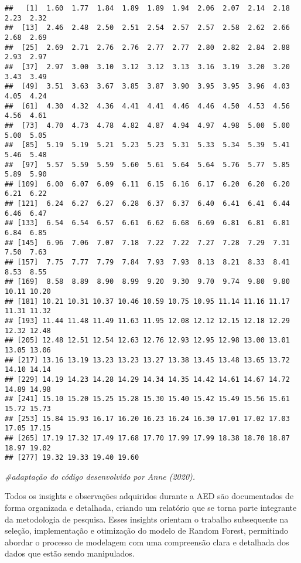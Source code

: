 \documentclass[
]{article}
\newenvironment{Shaded}{\begin{snugshade}}{\end{snugshade}}
\newcommand{\CommentTok}[1]{\textcolor[rgb]{0.56,0.35,0.01}{\textit{#1}}}
\begin{document}
\begin{verbatim}
##   [1]  1.60  1.77  1.84  1.89  1.89  1.94  2.06  2.07  2.14  2.18  2.23  2.32
##  [13]  2.46  2.48  2.50  2.51  2.54  2.57  2.57  2.58  2.62  2.66  2.68  2.69
##  [25]  2.69  2.71  2.76  2.76  2.77  2.77  2.80  2.82  2.84  2.88  2.93  2.97
##  [37]  2.97  3.00  3.10  3.12  3.12  3.13  3.16  3.19  3.20  3.20  3.43  3.49
##  [49]  3.51  3.63  3.67  3.85  3.87  3.90  3.95  3.95  3.96  4.03  4.05  4.24
##  [61]  4.30  4.32  4.36  4.41  4.41  4.46  4.46  4.50  4.53  4.56  4.56  4.61
##  [73]  4.70  4.73  4.78  4.82  4.87  4.94  4.97  4.98  5.00  5.00  5.00  5.05
##  [85]  5.19  5.19  5.21  5.23  5.23  5.31  5.33  5.34  5.39  5.41  5.46  5.48
##  [97]  5.57  5.59  5.59  5.60  5.61  5.64  5.64  5.76  5.77  5.85  5.89  5.90
## [109]  6.00  6.07  6.09  6.11  6.15  6.16  6.17  6.20  6.20  6.20  6.21  6.22
## [121]  6.24  6.27  6.27  6.28  6.37  6.37  6.40  6.41  6.41  6.44  6.46  6.47
## [133]  6.54  6.54  6.57  6.61  6.62  6.68  6.69  6.81  6.81  6.81  6.84  6.85
## [145]  6.96  7.06  7.07  7.18  7.22  7.22  7.27  7.28  7.29  7.31  7.50  7.63
## [157]  7.75  7.77  7.79  7.84  7.93  7.93  8.13  8.21  8.33  8.41  8.53  8.55
## [169]  8.58  8.89  8.90  8.99  9.20  9.30  9.70  9.74  9.80  9.80 10.11 10.20
## [181] 10.21 10.31 10.37 10.46 10.59 10.75 10.95 11.14 11.16 11.17 11.31 11.32
## [193] 11.44 11.48 11.49 11.63 11.95 12.08 12.12 12.15 12.18 12.29 12.32 12.48
## [205] 12.48 12.51 12.54 12.63 12.76 12.93 12.95 12.98 13.00 13.01 13.05 13.06
## [217] 13.16 13.19 13.23 13.23 13.27 13.38 13.45 13.48 13.65 13.72 14.10 14.14
## [229] 14.19 14.23 14.28 14.29 14.34 14.35 14.42 14.61 14.67 14.72 14.89 14.98
## [241] 15.10 15.20 15.25 15.28 15.30 15.40 15.42 15.49 15.56 15.61 15.72 15.73
## [253] 15.84 15.93 16.17 16.20 16.23 16.24 16.30 17.01 17.02 17.03 17.05 17.15
## [265] 17.19 17.32 17.49 17.68 17.70 17.99 17.99 18.38 18.70 18.87 18.97 19.02
## [277] 19.32 19.33 19.40 19.60
\end{verbatim}

\begin{Shaded}
\begin{Highlighting}[]
\CommentTok{\#adaptação do código desenvolvido por Anne (2020).}
\end{Highlighting}
\end{Shaded}

Todos os insights e observações adquiridos durante a AED são
documentados de forma organizada e detalhada, criando um relatório que
se torna parte integrante da metodologia de pesquisa. Esses insights
orientam o trabalho subsequente na seleção, implementação e otimização
do modelo de Random Forest, permitindo abordar o processo de modelagem
com uma compreensão clara e detalhada dos dados que estão sendo
manipulados.
\end{document}

